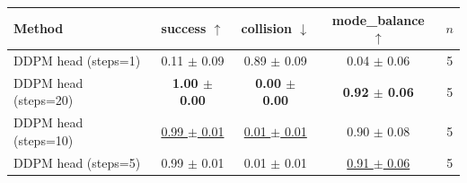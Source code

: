 \begin{tabular}{lcccc}
\toprule
Method & success $\uparrow$ & collision $\downarrow$ & mode\_balance $\uparrow$ & $n$ \\
\midrule
DDPM head (steps=1) & 0.11 $\pm$ 0.09 & 0.89 $\pm$ 0.09 & 0.04 $\pm$ 0.06 & 5 \\
DDPM head (steps=20) & \textbf{1.00 $\pm$ 0.00} & \textbf{0.00 $\pm$ 0.00} & \textbf{0.92 $\pm$ 0.06} & 5 \\
DDPM head (steps=10) & \underline{0.99 $\pm$ 0.01} & \underline{0.01 $\pm$ 0.01} & 0.90 $\pm$ 0.08 & 5 \\
DDPM head (steps=5) & 0.99 $\pm$ 0.01 & 0.01 $\pm$ 0.01 & \underline{0.91 $\pm$ 0.06} & 5 \\
\bottomrule
\end{tabular}
